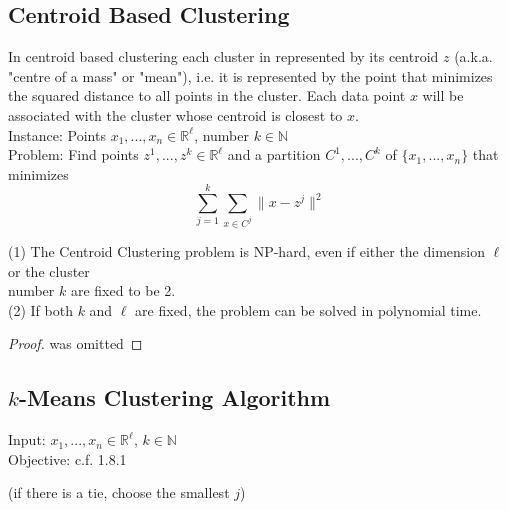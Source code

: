 \subsection{Centroid Based Clustering}
In centroid based clustering each cluster in represented by its centroid $z$ (a.k.a. "centre of a mass" or "mean"), i.e. it is represented by the point that minimizes the squared distance to all points in the cluster. Each data point $x$ will be associated with the cluster whose centroid is closest to $x$.\\

Instance: Points $x_1, ..., x_n \in \mathbb{R}^\ell$, number $k \in \mathbb{N}$\\
Problem: Find points $z^1,...,z^k \in \mathbb{R}^\ell$ and a partition $C^1,...,C^k$ of $\{x_1,...,x_n\}$ that minimizes\\
\begin{equation}
	\sum_{j=1}^k \sum_{x \in C^j} \lVert x-z^j \rVert ^2
\end{equation}

\begin{theorem}{}
	(1) The Centroid Clustering problem is NP-hard, even if either the dimension $\ell$ or the cluster\\
	number $k$ are fixed to be 2.\\
	(2) If both $k$ and $\ell$ are fixed, the problem can be solved in polynomial time.
\end{theorem}
\begin{proof}{}
	was omitted
\end{proof}

\subsection{$k$-Means Clustering Algorithm}
Input: $x_1,...,x_n \in \mathbb{R}^\ell$, $k \in \mathbb{N}$\\
Objective: c.f. 1.8.1\\

\begin{algorithmic}
	\Repeat 
		 \hspace{1cm} (if there is a tie, choose the smallest $j$)
	\EndFor
	\\
\end{algorithmic}

